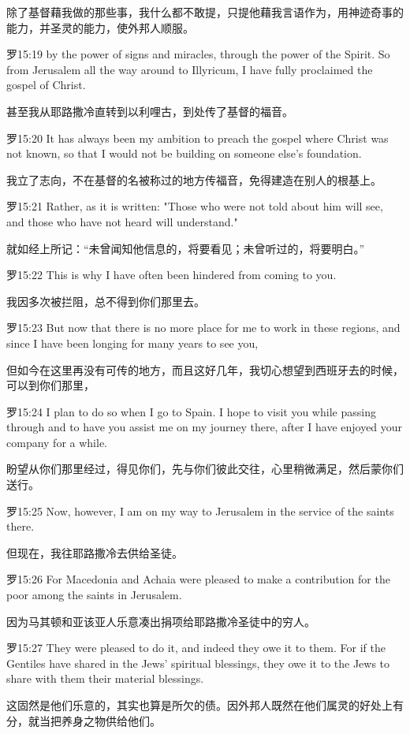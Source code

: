 \documentclass[a4paper,11pt,onecolumn,twoside]{ctexart}
\begin{document}
\begin{multicols}{2}
 除了基督藉我做的那些事，我什么都不敢提，只提他藉我言语作为，用神迹奇事的能力，并圣灵的能力，使外邦人顺服。


 罗15:19
 by the power of signs and miracles, through the power of the Spirit. So from Jerusalem all the way around to Illyricum, I have fully proclaimed the gospel of Christ.

 甚至我从耶路撒冷直转到以利哩古，到处传了基督的福音。


 罗15:20
 It has always been my ambition to preach the gospel where Christ was not known, so that I would not be building on someone else's foundation.

 我立了志向，不在基督的名被称过的地方传福音，免得建造在别人的根基上。


 罗15:21
 Rather, as it is written: "Those who were not told about him will see, and those who have not heard will understand."

 就如经上所记：“未曾闻知他信息的，将要看见；未曾听过的，将要明白。”


 罗15:22
 This is why I have often been hindered from coming to you.

 我因多次被拦阻，总不得到你们那里去。


 罗15:23
 But now that there is no more place for me to work in these regions, and since I have been longing for many years to see you,

 但如今在这里再没有可传的地方，而且这好几年，我切心想望到西班牙去的时候，可以到你们那里，


 罗15:24
 I plan to do so when I go to Spain. I hope to visit you while passing through and to have you assist me on my journey there, after I have enjoyed your company for a while.

 盼望从你们那里经过，得见你们，先与你们彼此交往，心里稍微满足，然后蒙你们送行。


 罗15:25
 Now, however, I am on my way to Jerusalem in the service of the saints there.

 但现在，我往耶路撒冷去供给圣徒。


 罗15:26
 For Macedonia and Achaia were pleased to make a contribution for the poor among the saints in Jerusalem.

 因为马其顿和亚该亚人乐意凑出捐项给耶路撒冷圣徒中的穷人。


 罗15:27
 They were pleased to do it, and indeed they owe it to them. For if the Gentiles have shared in the Jews' spiritual blessings, they owe it to the Jews to share with them their material blessings.

 这固然是他们乐意的，其实也算是所欠的债。因外邦人既然在他们属灵的好处上有分，就当把养身之物供给他们。



\end{multicols}
\end{document}
